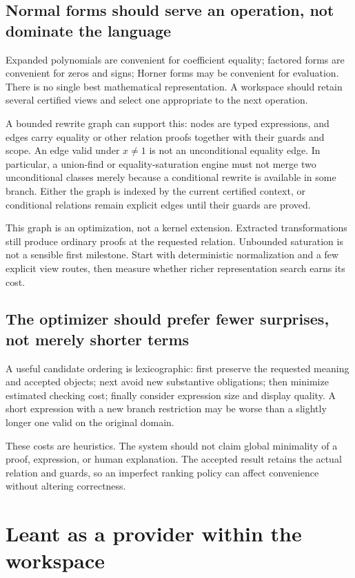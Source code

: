 \documentclass[11pt,letterpaper]{article}
\theoremstyle{definition}
\theoremstyle{remark}
\begin{document}
\subsection{Normal forms should serve an operation, not dominate the language}
Expanded polynomials are convenient for coefficient equality; factored forms
are convenient for zeros and signs; Horner forms may be convenient for evaluation.
There is no single best mathematical representation. A workspace should retain
several certified views and select one appropriate to the next operation.

A bounded rewrite graph can support this: nodes are typed expressions, and
edges carry equality or other relation proofs together with their guards and
scope. An edge valid under $x\neq1$ is not an unconditional equality edge.
In particular, a union-find or equality-saturation engine must not merge two
unconditional classes merely because a conditional rewrite is available in
some branch. Either the graph is indexed by the current certified context,
or conditional relations remain explicit edges until their guards are proved.

This graph is an optimization, not a kernel extension. Extracted transformations
still produce ordinary proofs at the requested relation. Unbounded saturation
is not a sensible first milestone. Start with deterministic normalization
and a few explicit view routes, then measure whether richer representation
search earns its cost.

\subsection{The optimizer should prefer fewer surprises, not merely shorter terms}
A useful candidate ordering is lexicographic: first preserve the requested
meaning and accepted objects; next avoid new substantive obligations; then
minimize estimated checking cost; finally consider expression size and display
quality. A short expression with a new branch restriction may be worse than a
slightly longer one valid on the original domain.

These costs are heuristics. The system should not claim global minimality of
a proof, expression, or human explanation. The accepted result retains the
actual relation and guards, so an imperfect ranking policy can affect convenience
without altering correctness.

\section{Leant as a provider within the workspace}
\label{sec:leant}
\end{document}
